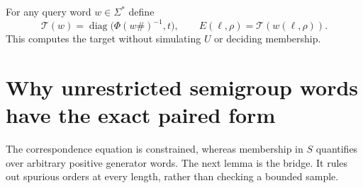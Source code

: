 \documentclass[11pt,letterpaper]{article}
\theoremstyle{definition}
\theoremstyle{remark}
\newcommand{\diag}{\operatorname{diag}}
\begin{document}
For any query word $w\in\Sigma^*$ define
\begin{equation}\label{gts:um:eq:target}
 \mathcal T(w)=\diag\bigl(\Phi(w\#)^{-1},t\bigr),\qquad
 E(\ell,\rho)=\mathcal T(w(\ell,\rho)).
\end{equation}
This computes the target without simulating $U$ or deciding membership.

\section[The exact paired form of unrestricted semigroup words]{Why unrestricted semigroup words have the exact paired form}
\label{gts:um:sec:marker}
The correspondence equation is constrained, whereas membership in $S$ quantifies over arbitrary positive generator words. The next lemma is the bridge. It rules out spurious orders at every length, rather than checking a bounded sample.
\end{document}
